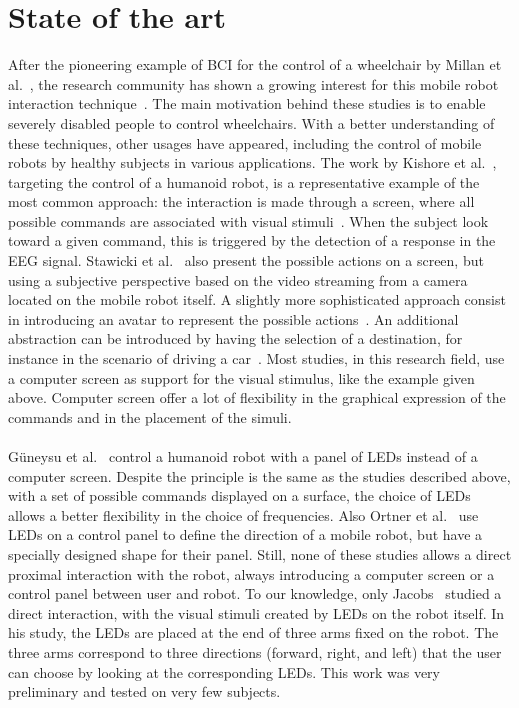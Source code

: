 \documentclass[smallextended]{svjour3}
\begin{document}
\section{State of the art}
\label{sec:soa}
After the pioneering example of BCI for the control of a wheelchair by Millan et al.~\cite{millan2004noninvasive}, the research community has shown a growing interest for this mobile robot interaction technique~\cite{Bi2013}. The main motivation behind these studies is to enable severely disabled people to control wheelchairs. With a better understanding of these techniques, other usages have appeared, including the control of mobile robots by healthy subjects in various applications. The work by Kishore et al.~\cite{kishore2014comparison}, targeting the control of a humanoid robot, is a representative example of the most common approach: the interaction is made through a screen, where all possible commands are associated with visual stimuli~\cite{Volosyak2009}. When the subject look toward a given command, this is triggered by the detection of a response in the EEG signal. Stawicki et al.~\cite{Stawicki2016} also present the possible actions on a screen, but using a subjective perspective based on the video streaming from a camera located on the mobile robot itself. A slightly more sophisticated approach consist in introducing an avatar to represent the possible actions~\cite{Faller2010}. An additional abstraction can be introduced by having the selection of a destination, for instance in the scenario of driving a car~\cite{Fan2015}. Most studies, in this research field, use a computer screen as support for the visual stimulus, like the example given above. Computer screen offer a lot of flexibility in the graphical expression of the commands and in the placement of the simuli. \\
\\
G{\"{u}}neysu et al.~\cite{Guneysu2013} control a humanoid robot with a panel of LEDs instead of a computer screen. Despite the principle is the same as the studies described above, with a set of possible commands displayed on a surface, the choice of LEDs allows a better flexibility in the choice of frequencies. Also Ortner et al.~\cite{Ortner2010} use LEDs on a control panel to define the direction of a mobile robot, but have a specially designed shape for their panel. Still, none of these studies allows a direct proximal interaction with the robot, always introducing a computer screen or a control panel between user and robot. To our knowledge, only Jacobs~\cite{Jacobs2013} studied a direct interaction, with the visual stimuli created by LEDs on the robot itself. In his study, the LEDs are placed at the end of three arms fixed on the robot. The three arms correspond to three directions (forward, right, and left) that the user can choose by looking at the corresponding LEDs. This work was very preliminary and tested on very few subjects.\\
\end{document}
